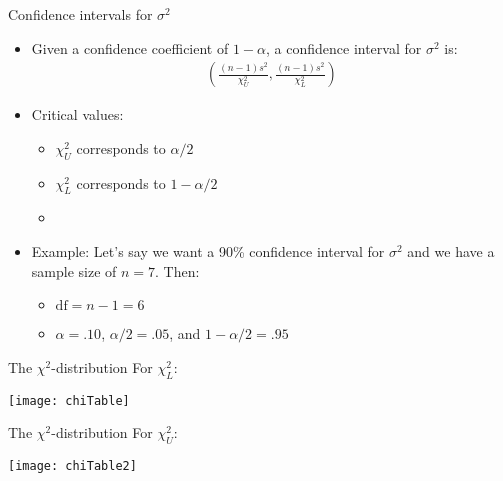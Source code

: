 \documentclass[xcolor=dvipsnames]{beamer}
\begin{document}
\begin{frame}{Confidence intervals for $\sigma^2$}
	\begin{itemize}
		\item Given a confidence coefficient of $1-\alpha$, a confidence interval for $\sigma^2$ is:
		\begin{gather*}
		\left(\frac{(n-1) s^2}{\chi_U^2}, \frac{(n-1)s^2}{\chi_L^2} \right)
		\end{gather*}
		\item Critical values:
		\begin{itemize}
			\item $\chi^2_U$ corresponds to $\alpha / 2$
			\item $\chi^2_L$ corresponds to $1 - \alpha / 2$
			\item[]
		\end{itemize}
	\item Example: Let's say we want a 90\% confidence interval for $\sigma^2$ and we have a sample size of $n = 7$. Then:
	\begin{itemize}
		\item  $\text{df} = n-1 = 6$
		\item $\alpha = .10$, $\alpha / 2 = .05$, and $1-\alpha / 2 = .95$
	\end{itemize}
	\end{itemize}
\end{frame}

\begin{frame}{The  $\chi^2$-distribution}
	For $\chi^2_L$:
	\begin{center}
		\texttt{[image: chiTable]}
	\end{center}
\end{frame}

\begin{frame}{The  $\chi^2$-distribution}
	For $\chi^2_U$:
	\begin{center}
		\texttt{[image: chiTable2]}
	\end{center}
\end{frame}
\end{document}
